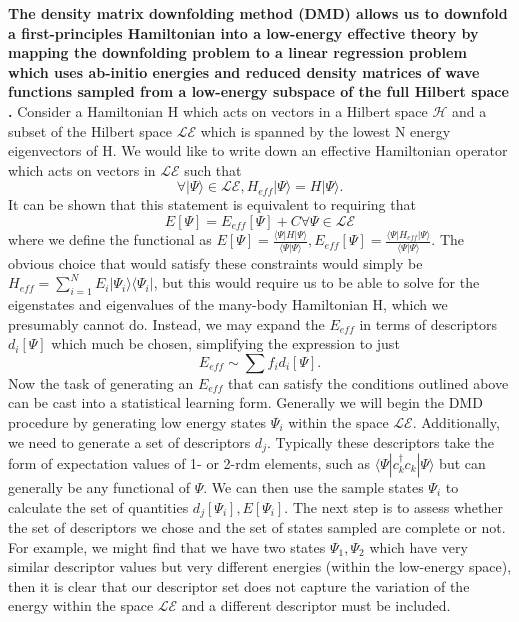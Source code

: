 \documentclass{article}
\begin{document}
\textbf{The density matrix downfolding method (DMD) allows us to downfold a first-principles Hamiltonian into a low-energy effective theory by mapping the downfolding problem to a linear regression problem which uses ab-initio energies and reduced density matrices of wave functions sampled from a low-energy subspace of the full Hilbert space \cite{10.3389/fphy.2018.00043}. }
Consider a Hamiltonian H which acts on vectors in a Hilbert space $\mathcal{H}$ and a subset of the Hilbert space $\mathcal{LE}$ which is spanned by the lowest N energy eigenvectors of H. 
We would like to write down an effective Hamiltonian operator which acts on vectors in $\mathcal{LE}$ such that  $$\forall |\Psi\rangle \in \mathcal{LE}, H_{eff}|\Psi \rangle = H|\Psi \rangle.$$ 
It can be shown that this statement is equivalent to requiring that $$ E[\Psi] = E_{eff}[\Psi] + C \forall \Psi \in \mathcal{LE}$$ where we define the functional as $E[\Psi] = \frac{\langle \Psi | H | \Psi \rangle}{\langle \Psi | \Psi \rangle},E_{eff}[\Psi] = \frac{\langle \Psi | H_{eff} | \Psi \rangle}{\langle \Psi | \Psi \rangle}$. 
The obvious choice that would satisfy these constraints would simply be $H_{eff} = \sum_{i=1}^{N} E_i |\Psi_i\rangle \langle \Psi_i|$, but this would require us to be able to solve for the eigenstates and eigenvalues of the many-body Hamiltonian H, which we presumably cannot do. 
Instead, we may expand the $E_{eff}$ in terms of descriptors $d_i[\Psi]$ which much be chosen, simplifying the expression to just 
\begin{equation}
E_{eff} \sim \sum f_i d_i[\Psi].
\end{equation}
Now the task of generating an $E_{eff}$ that can satisfy the conditions outlined above can be cast into a statistical learning form.
Generally we will begin the DMD procedure by generating low energy states $\Psi_i$ within the space $\mathcal{LE}$. 
Additionally, we need to generate a set of descriptors $d_j$. 
Typically these descriptors take the form of expectation values of 1- or 2-rdm elements, such as $\langle \Psi| c^\dagger_k c_k |\Psi \rangle$ but can generally be any functional of $\Psi$. 
We can then use the sample states $\Psi_i$ to calculate the set of quantities $d_j[\Psi_i], E[\Psi_i]$. 
The next step is to assess whether the set of descriptors we chose and the set of states sampled are complete or not. 
For example, we might find that we have two states $\Psi_1, \Psi_2$ which have very similar descriptor values but very different energies (within the low-energy space), then it is clear that our descriptor set does not capture the variation of the energy within the space $\mathcal{LE}$ and a different descriptor must be included. 
\end{document}
